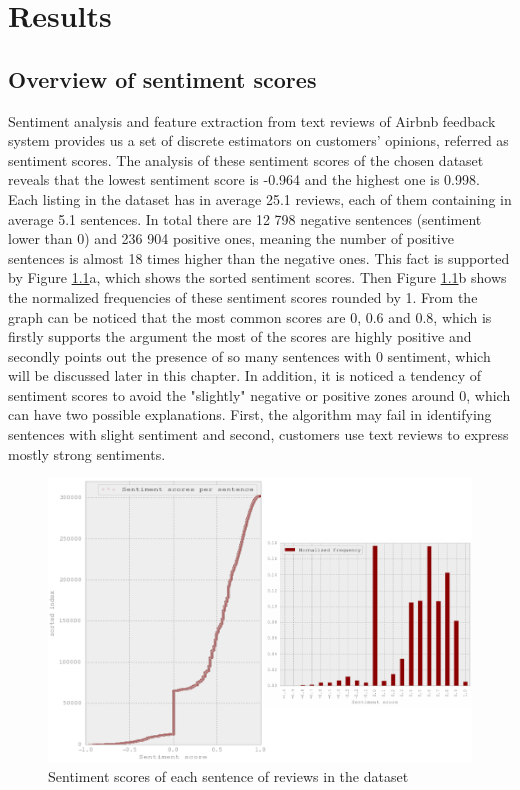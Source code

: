 %
%
\let\textcircled=\pgftextcircled
\chapter{Results}
\label{chap:res}
\section{Overview of sentiment scores}
Sentiment analysis and feature extraction from text reviews of Airbnb feedback system provides us a set of discrete estimators on customers' opinions, referred as sentiment scores. The analysis of these sentiment scores of the chosen dataset reveals that the lowest sentiment score is -0.964 and the highest one is 0.998. Each listing in the dataset has in average 25.1 reviews, each of them containing in average 5.1 sentences. In total there are 12 798 negative sentences (sentiment lower than 0) and 236 904 positive ones, meaning the number of positive sentences is almost 18 times higher than the negative ones.  This fact is supported by Figure \ref{fig:sent}a, which shows the sorted sentiment scores. Then Figure \ref{fig:sent}b shows the normalized frequencies of these sentiment scores rounded by 1. From the graph can be noticed that the most common scores are 0, 0.6 and 0.8, which is firstly supports the argument the most of the scores are highly positive and secondly points out the presence of so many sentences with 0 sentiment, which will be discussed later in this chapter. In addition, it is noticed a tendency of sentiment scores to avoid the "slightly" negative or positive zones around 0, which can have two possible explanations. First, the algorithm may fail in identifying sentences with slight sentiment and second, customers use text reviews to express mostly strong sentiments.
\begin{figure}[h!]
\centering
	\includegraphics[height=0.35\textheight]{normalized_sentiment_freq}
%
%
	\caption{Sentiment scores of each sentence of reviews in the dataset}
	\label{fig:sent}
\end{figure}
